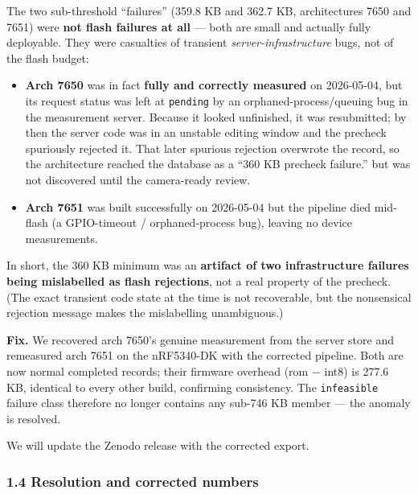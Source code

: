 \documentclass[11pt]{article}
\begin{document}
The two sub-threshold ``failures'' (359.8 KB and 362.7 KB, architectures 7650 and 7651) were \textbf{not flash failures at all} --- both are small and actually fully deployable. They were casualties of transient \textit{server-infrastructure} bugs, not of the flash budget:


\begin{itemize}\setlength{\itemsep}{2pt}
\item \textbf{Arch 7650} was in fact \textbf{fully and correctly measured} on 2026-05-04, but its request status was left at \texttt{pending} by an orphaned-process/queuing bug in the measurement server. Because it looked unfinished, it was resubmitted; by then the server code was in an unstable editing window and the precheck spuriously rejected it. That later spurious rejection overwrote the record, so the architecture reached the database as a ``360 KB precheck failure.'' but was not discovered until the camera-ready review.
\item \textbf{Arch 7651} was built successfully on 2026-05-04 but the pipeline died mid-flash (a GPIO-timeout / orphaned-process bug), leaving no device measurements.
\end{itemize}

In short, the 360 KB minimum was an \textbf{artifact of two infrastructure failures being mislabelled as flash rejections}, not a real property of the precheck. (The exact transient code state at the time is not recoverable, but the nonsensical rejection message makes the mislabelling unambiguous.)


\textbf{Fix.} We recovered arch 7650's genuine measurement from the server store and remeasured arch 7651 on the nRF5340-DK with the corrected pipeline. Both are now normal completed records; their firmware overhead (rom $-$ int8) is 277.6 KB, identical to every other build, confirming consistency. The \texttt{infeasible} failure class therefore no longer contains any sub-746 KB member --- the anomaly is resolved.


We will update the Zenodo release with the corrected export.



\subsubsection*{1.4 Resolution and corrected numbers}
\end{document}
